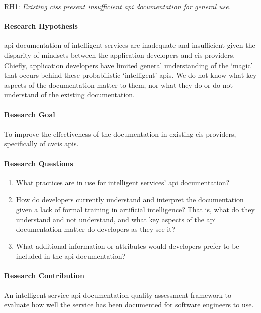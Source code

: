 \begin{titled-frame}{\underline{RH1}: \textit{Existing \glspl{cis} present insufficient \gls{api} documentation for general use.} }
\label{rh1}
\vspace{-12pt}
\paragraph{Research Hypothesis}
\gls{api} documentation of intelligent services are inadequate and insufficient given the disparity of mindsets between the application developers and \gls{cis} providers. Chiefly, application developers have limited general understanding of the `magic' that occurs behind these probabilistic `intelligent' \glspl{api}. We do not know what key aspects of the documentation matter to them, nor what they do or do not understand of the existing documentation.

\paragraph{Research Goal}
To improve the effectiveness of the documentation in existing \gls{cis} providers, specifically of \gls{cvcis} \glspl{api}.

\paragraph{Research Questions}
\begin{enumerate}[label=\textbf{RQ1.\arabic*.}, ref=RQ1.\arabic*, leftmargin=3.5\parindent, rightmargin=1\parindent]
  \item What practices are in use for intelligent services' \gls{api} documentation? 
  \label{rqs:apidoc:what-is-in-use}
  
  \item How do developers currently understand and interpret the documentation given a lack of formal training in artificial intelligence? That is, what do they understand and not understand, and what key aspects of the \gls{api} documentation matter do developers as they see it?
  \label{rqs:apidoc:how-do-devs-understand-it}
  
  \item What additional information or attributes would developers prefer to be included in the \gls{api} documentation?
  \label{rqs:apidoc:what-additional-information-needed}
\end{enumerate}

\paragraph{Research Contribution} An intelligent service \gls{api} documentation quality assessment framework to evaluate how well the service has been documented for software engineers to use.

\end{titled-frame}

